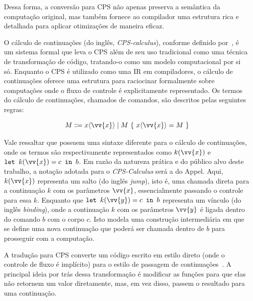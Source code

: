 Dessa forma, a conversão para CPS não apenas preserva a semântica da computação original, mas também fornece ao compilador uma estrutura rica e detalhada para aplicar otimizações de maneira eficaz.

O cálculo de continuações (do inglês, \textit{CPS-calculus}), conforme definido por~, é um sistema formal que leva o CPS além de seu uso tradicional como uma técnica de transformação de código, tratando-o como um modelo computacional por si só.
Enquanto o CPS é utilizado como uma IR em compiladores, o cálculo de continuações oferece uma estrutura para raciocinar formalmente sobre computações onde o fluxo de controle é explicitamente representado.
Os termos do cálculo de continuações, chamados de comandos, são descritos pelas seguintes regras:

\begin{equation*}
  M \Coloneqq x\langle \vv{x} \rangle \mid M\ \{\ x\langle \vv{x} \rangle = M\ \}
\end{equation*}

Vale ressaltar que  possuem uma sintaxe diferente para o cálculo de continuações, onde os termos são respectivamente representados como $k(\vv{x})$ e $\texttt{let }k(\vv{x}) = c \texttt{ in } b$.
Em razão da natureza prática e do público alvo deste trabalho, a notação adotada para o \textit{CPS-Calculus} será a do Appel.
Aqui, $k(\vv{x})$ representa um salto (do inglês \textit{jump}), isto é, uma chamada direta para a continuação $k$ com os parâmetros $\vv{x}$, essencialmente passando o controle para essa $k$.
Enquanto que $\texttt{let }k(\vv{y}) = c \texttt{ in } b$ representa um vínculo (do inglês \textit{binding}), onde a continuação $k$ com os parâmetros $\vv{y}$ é ligada dentro do comando $b$ com o corpo $c$.
Isto modela uma construção intermediária em que se define uma nova continuação que poderá ser chamada dentro de $b$ para prosseguir com a computação.

A tradução para CPS converte um código escrito em estilo direto (onde o controle de fluxo é implícito) para o estilo de passagem de continuações~\cite{flanagan1993essence}.
A principal ideia por trás dessa transformação é modificar as funções para que elas não retornem um valor diretamente, mas, em vez disso, passem o resultado para uma continuação.





